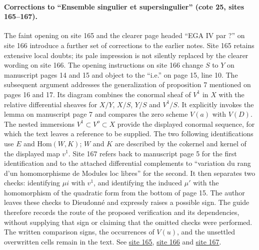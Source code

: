 \documentclass[10pt,a4paper]{article}
\begin{document}
\paragraph{Corrections to ``Ensemble singulier et supersingulier'' (cote 25, sites 165--167).}
The faint opening on site 165 and the clearer page headed ``EGA IV par ?'' on site 166 introduce a further set of corrections to the earlier notes. Site 165 retains extensive local doubts; its pale impression is not silently replaced by the clearer wording on site 166. The opening instructions on site 166 change $S$ to $Y$ on manuscript pages 14 and 15 and object to the ``i.e.'' on page 15, line 10. The subsequent argument addresses the generalization of proposition 7 mentioned on pages 16 and 17. Its diagram combines the conormal sheaf of $V^1$ in $X$ with the relative differential sheaves for $X/Y$, $X/S$, $Y/S$ and $V^1/S$. It explicitly invokes the lemma on manuscript page 7 and compares the zero scheme $V(a)$ with $V(D)$. The nested immersions $V^1\subset V^o\subset X$ provide the displayed conormal sequence, for which the text leaves a reference to be supplied. The two following identifications use $E$ and $\mathrm{Hom}(W,K)$; $W$ and $K$ are described by the cokernel and kernel of the displayed map $v^1$. Site 167 refers back to manuscript page 5 for the first identification and to the attached differential complements to ``variation du rang d'un homomorphisme de Modules loc libres'' for the second. It then separates two checks: identifying $\mu i$ with $v^1$, and identifying the induced $\mu'$ with the homomorphism of the quadratic form from the bottom of page 15. The author leaves these checks to Dieudonné and expressly raises a possible sign. The guide therefore records the route of the proposed verification and its dependencies, without supplying that sign or claiming that the omitted checks were performed. The written comparison signs, the occurrences of $V(u)$, and the unsettled overwritten cells remain in the text. See \href{https://grothendieck.umontpellier.fr/web/viewer.html?file=../25.pdf#page=166}{site 165}, \href{https://grothendieck.umontpellier.fr/web/viewer.html?file=../25.pdf#page=167}{site 166} and \href{https://grothendieck.umontpellier.fr/web/viewer.html?file=../25.pdf#page=168}{site 167}.
\end{document}

